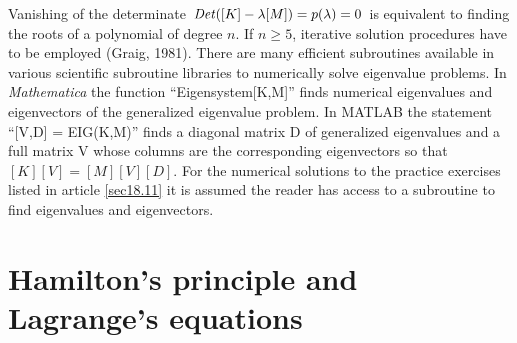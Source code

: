 \documentclass{AeroStructure-ERJohnson}
\begin{document}
Vanishing of the determinate $\operatorname{\it Det}([K]-\lambda[M])=p(\lambda)=0$ is equivalent to finding the roots of a polynomial of degree $n$. If $n \geq 5$, iterative solution procedures have to be employed (Graig, 1981). There are many efficient subroutines available in various scientific subroutine libraries to numerically solve eigenvalue problems. In \textit{Mathematica} the function ``Eigensystem[{K,M}]'' finds numerical eigenvalues and eigenvectors of the generalized eigenvalue problem. In MATLAB the statement ``[V,D] = EIG(K,M)'' finds a diagonal matrix D of generalized eigenvalues and a full matrix V whose columns are the corresponding eigenvectors so that $[K][V]=[M][V][D]$. For the numerical solutions to the practice exercises listed in article \ref{sec18.11} it is assumed the reader has access to a subroutine to find eigenvalues and eigenvectors.

{\def\thefigure{18.6}
}

\section{Hamilton's principle and Lagrange's equations}\label{sec18.5}
\end{document}
